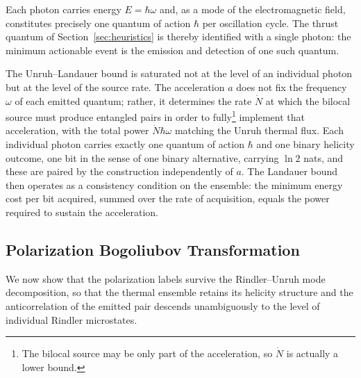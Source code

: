 \documentclass[12pt,a4paper]{article}
\begin{document}
Each photon carries energy $E = \hbar\omega$ and, as a mode of the electromagnetic field, constitutes precisely one quantum of action $\hbar$ per oscillation cycle. The thrust quantum of Section~\ref{sec:heuristics} is thereby identified with a single photon: the minimum actionable event is the emission and detection of one such quantum.

The Unruh--Landauer bound is saturated not at the level of an individual 
photon but at the level of the source rate. The acceleration $a$ does not 
fix the frequency $\omega$ of each emitted quantum; rather, it determines 
the rate $\dot{N}$ at which the bilocal source must produce entangled pairs 
in order to fully\footnote{The bilocal source may be only part of the acceleration, so $\dot{N}$ is actually a lower bound.} implement that acceleration, with the total power 
$\dot{N}\hbar\omega$ matching the Unruh thermal flux. Each individual photon 
carries exactly one quantum of action $\hbar$ and one binary helicity 
outcome, one bit in the sense of one binary alternative, carrying 
$\ln 2$ nats, and these are paired by the construction independently 
of $a$. The Landauer bound then operates as a consistency condition on 
the ensemble: the minimum energy cost per bit acquired, summed over the 
rate of acquisition, equals the power required to sustain the acceleration.

\subsection{Polarization Bogoliubov Transformation}

We now show that the polarization labels survive the Rindler--Unruh mode decomposition,
so that the thermal ensemble retains its helicity structure and the anticorrelation of the
emitted pair descends unambiguously to the level of individual Rindler microstates.
\end{document}
